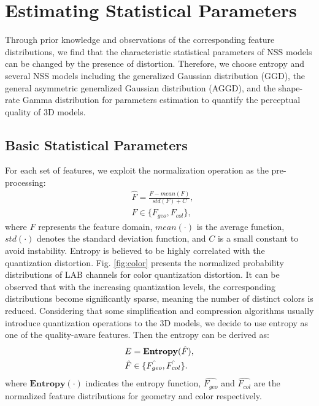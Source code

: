 \documentclass[lettersize,journal]{IEEEtran}
\begin{document}
\section{Estimating Statistical Parameters}
\label{sec:estimate nss parameters}
Through prior knowledge and observations of the corresponding feature distributions, we find that the characteristic statistical parameters of NSS models can be changed by the presence of distortion. Therefore, we choose entropy and several NSS models including the generalized Gaussian distribution (GGD), the general asymmetric generalized Gaussian distribution (AGGD), and the shape-rate Gamma distribution for parameters estimation to quantify the perceptual quality of 3D models. 



\subsection{Basic Statistical Parameters}
For each set of features, we exploit the normalization operation as the pre-processing:
\begin{equation}
 \begin{aligned}
    & \hat{F}=\frac{F-mean(F)}{std(F)+C},\\
    & F \in \{F_{geo}, F_{col}\} ,
\end{aligned} 
\label{equ:mean} 
\end{equation}
where $F$ represents the feature domain, $mean(\cdot)$ is the average function, $std(\cdot)$ denotes the standard deviation function, and $C$ is a small constant to avoid instability.
Entropy is believed to be highly correlated with the quantization distortion. Fig. \ref{fig:color} presents the normalized probability distributions of LAB channels for color quantization distortion. It can be observed that with the increasing quantization levels, the corresponding distributions become significantly sparse, meaning the number of distinct colors is reduced.  
Considering that some simplification and compression algorithms usually introduce quantization operations to the 3D models, we decide to use entropy as one of the quality-aware features.
Then the entropy can be derived as:
\begin{equation}
   \begin{aligned}
    &E = \boldsymbol{\rm{Entropy}}(\hat{F}),\\
    &\hat{F} \in \{\hat{F_{geo}}, \hat{F_{col}}\}.
\end{aligned}
\label{equ:entropy} 
\end{equation}
where $\mathbf{Entropy}(\cdot)$ indicates the entropy function, $\hat{F_{geo}}$ and $\hat{F_{col}}$ are the normalized feature distributions for geometry and color respectively.  
\end{document}
